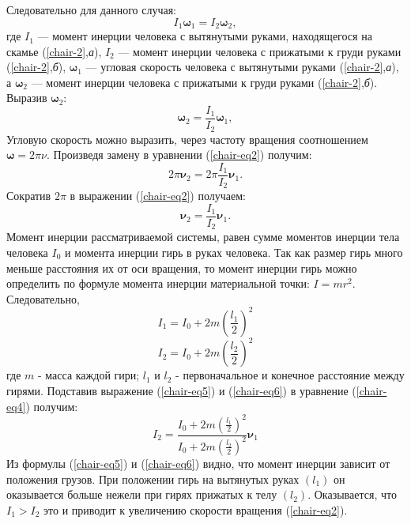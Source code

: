 \documentclass[14pt,a4paper,oneside]{extarticle}	%
\begin{document}
 Следовательно для данного случая:
 \begin{equation}\label{chair-eq1}
 I_{1}\bm{\omega}_{1} =  I_{2}\bm{\omega}_{2},
 \end{equation} 
 где $ I_{1}  $ — момент инерции человека с вытянутыми руками, находящегося на скамье (\ref{chair-2},\textit{а}), $ I_{2}  $ — момент инерции человека с прижатыми к груди руками (\ref{chair-2},\textit{б}), $ \bm{\omega}_{1} $ — угловая скорость человека с вытянутыми руками (\ref{chair-2},\textit{а}), а $ \bm{\omega}_{2}  $ — момент инерции человека с прижатыми к груди руками (\ref{chair-2},\textit{б}).
 Выразив $ \bm{\omega}_{2} $:
 \begin{equation}\label{chair-eq2}
 \bm{\omega}_{2} =  \frac{I_{1}}{I_{2}}\bm{\omega}_{1},
 \end{equation}
 Угловую скорость можно выразить, через частоту вращения соотношением $ \bm{\omega} = 2\pi \nu  $.
 Произведя замену в уравнении (\ref{chair-eq2}) получим:
 \begin{equation}\label{chair-eq3}
 2\pi \bm{\nu}_{2} = 2\pi \frac{I_{1}}{I_{2}}\bm{\nu}_{1}.
 \end{equation}
 Сократив $  2\pi $ в выражении (\ref{chair-eq2}) получаем:
 \begin{equation}\label{chair-eq4}
 \bm{\nu}_{2} = \frac{I_{1}}{I_{2}}\bm{\nu}_{1}.
 \end{equation}
Момент инерции рассматриваемой системы, равен сумме моментов инерции тела человека $ I_{0} $ и момента инерции гирь в руках человека. Так как размер гирь много меньше расстояния их от оси вращения, то момент инерции гирь можно определить по формуле момента инерции материальной точки: $ I = mr^{2} $.
Следовательно,
\begin{equation}\label{chair-eq5}
I_{1} = I_{0} + 2m \left(\frac{l_{1}}{2} \right)^{2} 
\end{equation}
\begin{equation}\label{chair-eq6}
I_{2} = I_{0} + 2m \left(\frac{l_{2}}{2} \right)^{2} 
\end{equation}
где $ m $ - масса каждой гири; $ l_{1} $ и $ l_{2} $ - первоначальное и конечное  расстояние между гирями.
Подставив выражение  (\ref{chair-eq5}) и  (\ref{chair-eq6}) в уравнение (\ref{chair-eq4}) получим:
\begin{equation}\label{chair-eq7}
I_{2} =  \frac{I_{0} + 2m \left(\frac{l_{1}}{2} \right)^{2}}{I_{0} + 2m \left(\frac{l_{2}}{2} \right)^{2}}\bm{\nu}_{1}
\end{equation}
Из формулы  (\ref{chair-eq5}) и  (\ref{chair-eq6}) видно, что момент инерции зависит от положения грузов. 
При положении гирь на вытянутых руках $ (l_{1}) $ он оказывается больше нежели при гирях прижатых к телу $ (l_{2}) $.
Оказывается, что $ I_{1} > I_{2} $ это и приводит к увеличению скорости вращения (\ref{chair-eq2}).
\newpage
\end{document}
